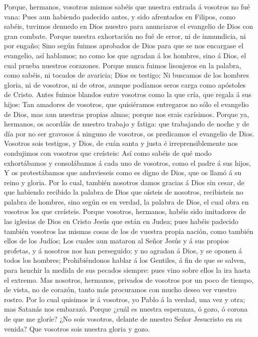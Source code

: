  Porque, hermanos, vosotros mismos sabéis que nuestra
entrada á vosotros no fué vana:  Pues aun habiendo
padecido antes, y sido afrentados en Filipos, como sabéis, tuvimos
denuedo en Dios nuestro para anunciaros el evangelio de Dios con gran
combate.  Porque nuestra exhortación no fué de error, ni
de inmundicia, ni por engaño;  Sino según fuimos aprobados
de Dios para que se nos encargase el evangelio, así hablamos; no como
los que agradan á los hombres, sino á Dios, el cual prueba nuestros
corazones.  Porque nunca fuimos lisonjeros en la palabra,
como sabéis, ni tocados de avaricia; Dios es testigo;  Ni
buscamos de los hombres gloria, ni de vosotros, ni de otros, aunque
podíamos seros carga como apóstoles de Cristo.  Antes
fuimos blandos entre vosotros como la que cría, que regala á sus hijos:
 Tan amadores de vosotros, que quisiéramos entregaros no
sólo el evangelio de Dios, mas aun nuestras propias almas; porque nos
erais carísimos.  Porque ya, hermanos, os acordáis de
nuestro trabajo y fatiga: que trabajando de noche y de día por no ser
gravosos á ninguno de vosotros, os predicamos el evangelio de Dios.
 Vosotros sois testigos, y Dios, de cuán santa y justa é
irreprensiblemente nos condujimos con vosotros que creísteis:
 Así como sabéis de qué modo exhortábamos y consolábamos
á cada uno de vosotros, como el padre á sus hijos,  Y os
protestábamos que anduvieseis como es digno de Dios, que os llamó á su
reino y gloria.  Por lo cual, también nosotros damos
gracias á Dios sin cesar, de que habiendo recibido la palabra de Dios
que oísteis de nosotros, recibisteis no palabra de hombres, sino según
es en verdad, la palabra de Dios, el cual obra en vosotros los que
creísteis.  Porque vosotros, hermanos, habéis sido
imitadores de las iglesias de Dios en Cristo Jesús que están en Judea;
pues habéis padecido también vosotros las mismas cosas de los de vuestra
propia nación, como también ellos de los Judíos;  Los
cuales aun mataron al Señor Jesús y á sus propios profetas, y á nosotros
nos han perseguido; y no agradan á Dios, y se oponen á todos los
hombres;  Prohibiéndonos hablar á los Gentiles, á fin de
que se salven, para henchir la medida de sus pecados siempre: pues vino
sobre ellos la ira hasta el extremo.  Mas nosotros,
hermanos, privados de vosotros por un poco de tiempo, de vista, no de
corazón, tanto más procuramos con mucho deseo ver vuestro rostro.
 Por lo cual quisimos ir á vosotros, yo Pablo á la
verdad, una vez y otra; mas Satanás nos embarazó.  Porque
¿cuál es nuestra esperanza, ó gozo, ó corona de que me gloríe? ¿No sois
vosotros, delante de nuestro Señor Jesucristo en su venida?
 Que vosotros sois nuestra gloria y gozo.

